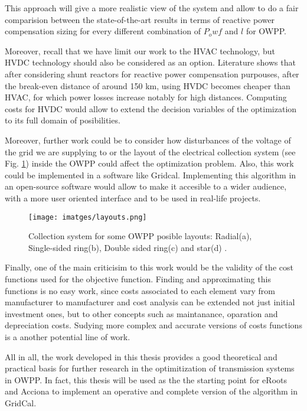 \documentclass[a4paper,11pt, titlepage, twoside]{article}
\begin{document}
This approach will give a more realistic view of the system and allow to do a fair comparision between the state-of-the-art results in terms of reactive power compensation sizing for every different combination of $P_owf$ and $l$ for OWPP. \par

Moreover, recall that we have limit our work to the HVAC technology, but HVDC technology should also be considered as an option.
Literature \cite{paperbase} shows that after considering shunt reactors for reactive power compensation purpouses, after the break-even distance of around 150 km,
using HVDC becomes cheaper than HVAC, for which power losses increase notably for high distances. Computing costs for HVDC would allow to extend the decision variables of the optimization to its full
domain of posibilities.\par

Moreover, further work could be to consider how disturbances of the voltage of the grid we are supplying to or the layout of the electrical collection system (see Fig. \ref{layouts_shape}) inside the OWPP could affect the optimization problem. 
Also, this work could be implemented in a software like Gridcal. Implementing this algorithm in an open-source software would allow to make it accesible to a wider audience, with a more user oriented interface and to be used in real-life projects.

\begin{figure}[H]
    \centering
    \texttt{[image: imatges/layouts.png]}
    \caption{Collection system for some OWPP posible layouts: Radial(a), Single-sided ring(b), Double sided ring(c) and star(d) \cite{layouts_coll}.}
    \label{layouts_shape}
\end{figure}

Finally, one of the main criticisim to this work would be the validity of the cost functions used for the objective function. Finding and approximating this functions is no easy work,
since costs associated to each element vary from manufacturer to manufacturer and cost analysis can be extended not just initial investment ones, but to other concepts such as maintanance, oparation and depreciation costs. Sudying more complex and accurate 
versions of costs functions is a another potential line of work.\par

All in all, the work developed in this thesis provides a good theoretical and practical basis for further research in the optimitization of transmission systems in OWPP. In fact, this thesis will be used as the the starting point for eRoots  and Acciona to implement an operative and complete version of the algorithm in GridCal.
\end{document}
